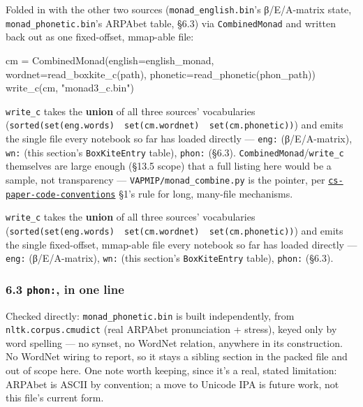 \documentclass[
  10pt,
]{article}
\newenvironment{Shaded}{}{}
\newcommand{\NormalTok}[1]{#1}
\newcommand{\OperatorTok}[1]{\textcolor[rgb]{0.40,0.40,0.40}{#1}}
\newcommand{\StringTok}[1]{\textcolor[rgb]{0.25,0.44,0.63}{#1}}
\begin{document}
Folded in with the other two sources (\texttt{monad\_english.bin}'s
β/E/A-matrix state, \texttt{monad\_phonetic.bin}'s ARPAbet table, §6.3)
via \texttt{CombinedMonad} and written back out as one fixed-offset,
mmap-able file:

\begin{Shaded}
\begin{Highlighting}[]
\NormalTok{cm }\OperatorTok{=}\NormalTok{ CombinedMonad(english}\OperatorTok{=}\NormalTok{english\_monad, wordnet}\OperatorTok{=}\NormalTok{read\_boxkite\_c(path),}
\NormalTok{                    phonetic}\OperatorTok{=}\NormalTok{read\_phonetic(phon\_path))}
\NormalTok{write\_c(cm, }\StringTok{"monad3\_c.bin"}\NormalTok{)}
\end{Highlighting}
\end{Shaded}

\texttt{write\_c} takes the \textbf{union} of all three sources'
vocabularies
(\texttt{sorted(set(eng.words)\ \textbar{}\ set(cm.wordnet)\ \textbar{}\ set(cm.phonetic))})
and emits the single file every notebook so far has loaded directly ---
\texttt{eng:} (β/E/A-matrix), \texttt{wn:} (this section's
\texttt{BoxKiteEntry} table), \texttt{phon:} (§6.3).
\texttt{CombinedMonad}/\texttt{write\_c} themselves are large enough
(§13.5 scope) that a full listing here would be a sample, not
transparency --- \texttt{VAPMIP/monad\_combine.py} is the pointer, per
\href{../../.claude/skills/cs-paper-code-conventions/SKILL.md}{\texttt{cs-paper-code-conventions}}
§1's rule for long, many-file mechanisms.

\texttt{write\_c} takes the \textbf{union} of all three sources'
vocabularies
(\texttt{sorted(set(eng.words)\ \textbar{}\ set(cm.wordnet)\ \textbar{}\ set(cm.phonetic))})
and emits the single fixed-offset, mmap-able file every notebook so far
has loaded directly --- \texttt{eng:} (β/E/A-matrix), \texttt{wn:} (this
section's \texttt{BoxKiteEntry} table), \texttt{phon:} (§6.3).

\hypertarget{phon-in-one-line}{%
\subsubsection{\texorpdfstring{6.3 \texttt{phon:}, in one
line}{6.3 phon:, in one line}}\label{phon-in-one-line}}

Checked directly: \texttt{monad\_phonetic.bin} is built independently,
from \texttt{nltk.corpus.cmudict} (real ARPAbet pronunciation + stress),
keyed only by word spelling --- no synset, no WordNet relation, anywhere
in its construction. No WordNet wiring to report, so it stays a sibling
section in the packed file and out of scope here. One note worth
keeping, since it's a real, stated limitation: ARPAbet is ASCII by
convention; a move to Unicode IPA is future work, not this file's
current form.
\end{document}
